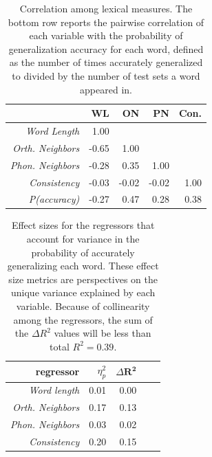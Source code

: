 \documentclass[10pt,letterpaper]{article}
\begin{document}
\begin{table}[b]
	\begin{tabular}{r r r r r}
		                     & WL & ON & PN & Con. \\
       \toprule
		\textit{Word Length}          &  1.00 & & & \\
		\textit{Orth. Neighbors}      & -0.65 &  1.00 & & \\
		\textit{Phon. Neighbors}      & -0.28 &  0.35 &  1.00 & \\
		\textit{Consistency}          & -0.03 & -0.02 & -0.02 & 1.00 \\
		\midrule
		\textit{P(accuracy)}          & -0.27  & 0.47 & 0.28 & 0.38 \\
	\end{tabular}
	\caption{Correlation among lexical measures. The bottom row reports the pairwise correlation of each variable with the probability of generalization accuracy for each word, defined as the number of times accurately generalized to divided by the number of test sets a word appeared in.} 
	\label{tab:cormat}
\end{table}

%
%	

\begin{table}[b]
	\begin{center}
		\begin{tabular}{r r r r r}
			\textbf{regressor} & $\eta^2_p$ & $\Delta \mathbf{R^2}$ \\
			\toprule
\textit{Word length}       & 0.01 & 0.00 \\
\textit{Orth. Neighbors}   & 0.17 & 0.13 \\
\textit{Phon. Neighbors}   & 0.03 & 0.02 \\
\textit{Consistency}       & 0.20 & 0.15 \\
\bottomrule

		\end{tabular}
		\caption{Effect sizes for the regressors that account for variance in the probability of accurately generalizing each word. These effect size metrics are perspectives on the unique variance explained by each variable. Because of collinearity among the regressors, the sum of the $\Delta R^2$ values will be less than total $R^2 = 0.39$.}
		\label{tab:effectsize}
	\end{center}
\end{table}
\end{document}

